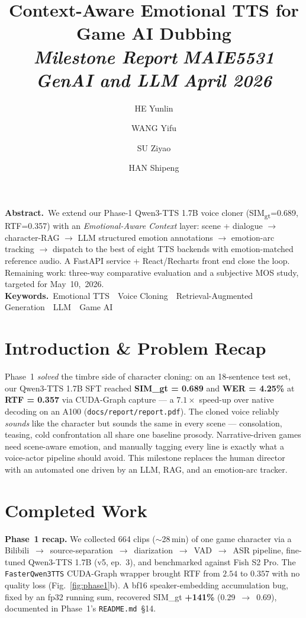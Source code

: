 \documentclass[10pt,a4paper]{article}
\title{Context-Aware Emotional TTS for Game AI Dubbing\\[2pt]
  {\normalsize\sffamily\mdseries\itshape\color{mutedtext}%
   Milestone Report\,\textbullet\,MAIE5531 GenAI and LLM\,\textbullet\,April 2026}}
\author[1]{HE Yunlin}
\author[1]{WANG Yifu}
\author[1]{SU Ziyao}
\author[1]{HAN Shipeng}
\affil[1]{AI \& Entrepreneurship, Hong Kong University of Science and Technology}
\begin{document}
\maketitle
\thispagestyle{fancy}

\vspace{-0.8em}
\begin{infobox}
\noindent\small
{\sffamily\bfseries\color{primary}Abstract.}~We extend our Phase-1 Qwen3-TTS 1.7B voice cloner (SIM\textsubscript{gt}=0.689, RTF=0.357) with an \emph{Emotional-Aware Context} layer: scene + dialogue $\rightarrow$ character-RAG $\rightarrow$ LLM structured emotion annotations $\rightarrow$ emotion-arc tracking $\rightarrow$ dispatch to the best of eight TTS backends with emotion-matched reference audio. A FastAPI service + React/Recharts front end close the loop. Remaining work: three-way comparative evaluation and a subjective MOS study, targeted for May~10,~2026.\\[2pt]
{\sffamily\bfseries\color{primary}Keywords.}~Emotional TTS~\textbullet~Voice Cloning~\textbullet~Retrieval-Augmented Generation~\textbullet~LLM~\textbullet~Game AI
\end{infobox}

\vspace{2pt}

\section{Introduction \& Problem Recap}
Phase~1 \emph{solved} the timbre side of character cloning: on an 18-sentence test set, our Qwen3-TTS 1.7B SFT reached \textbf{SIM\_gt = 0.689} and \textbf{WER = 4.25\%} at \textbf{RTF = 0.357} via CUDA-Graph capture --- a $7.1\times$ speed-up over native decoding on an A100 (\texttt{docs/report/report.pdf}). The cloned voice reliably \emph{sounds} like the character but sounds the same in every scene --- consolation, teasing, cold confrontation all share one baseline prosody. Narrative-driven games need scene-aware emotion, and manually tagging every line is exactly what a voice-actor pipeline should avoid. This milestone replaces the human director with an automated one driven by an LLM, RAG, and an emotion-arc tracker.

\section{Completed Work}
\textbf{Phase~1 recap.} We collected 664 clips ($\sim$28\,min) of one game character via a Bilibili~$\rightarrow$~source-separation~$\rightarrow$~diarization~$\rightarrow$~VAD~$\rightarrow$~ASR pipeline, fine-tuned Qwen3-TTS 1.7B (v5, ep.~3), and benchmarked against Fish S2 Pro. The \texttt{FasterQwen3TTS} CUDA-Graph wrapper brought RTF from $2.54$ to $0.357$ with no quality loss (Fig.~\ref{fig:phase1}b). A bf16 speaker-embedding accumulation bug, fixed by an fp32 running sum, recovered SIM\_gt \textbf{+141\%} (0.29~$\rightarrow$~0.69), documented in Phase~1's \texttt{README.md}~§14.
\end{document}
